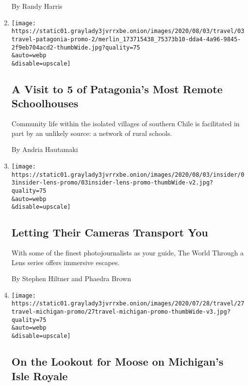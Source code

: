 \begin{enumerate}
  By Randy Harris
\item
  \href{/2020/08/03/travel/remote-schools-patagonia.html}{}

  \texttt{[image: https://static01.graylady3jvrrxbe.onion/images/2020/08/03/travel/03travel-patagonia-promo-2/merlin\_173715438\_75373b10-dda4-4a96-9845-2f9eb704acd2-thumbWide.jpg?quality=75\\\&auto=webp\\\&disable=upscale]}

  \hypertarget{a-visit-to-5-of-patagonias-most-remote-schoolhouses}{%
  \subsection{A Visit to 5 of Patagonia's Most Remote
  Schoolhouses}\label{a-visit-to-5-of-patagonias-most-remote-schoolhouses}}

  Community life within the isolated villages of southern Chile is
  facilitated in part by an unlikely source: a network of rural schools.

  By Andria Hautamaki
\item
  \href{/2020/08/03/insider/letting-their-cameras-transport-you.html}{}

  \texttt{[image: https://static01.graylady3jvrrxbe.onion/images/2020/08/03/insider/03insider-lens-promo/03insider-lens-promo-thumbWide-v2.jpg?quality=75\\\&auto=webp\\\&disable=upscale]}

  \hypertarget{letting-their-cameras-transport-you}{%
  \subsection{Letting Their Cameras Transport
  You}\label{letting-their-cameras-transport-you}}

  With some of the finest photojournalists as your guide, The World
  Through a Lens series offers immersive escapes.

  By Stephen Hiltner and Phaedra Brown
\item
  \href{/2020/07/27/travel/moose-michigan-isle-royale.html}{}

  \texttt{[image: https://static01.graylady3jvrrxbe.onion/images/2020/07/28/travel/27travel-michigan-promo/27travel-michigan-promo-thumbWide-v3.jpg?quality=75\\\&auto=webp\\\&disable=upscale]}

  \hypertarget{on-the-lookout-for-moose-on-michigans-isle-royale}{%
  \subsection{On the Lookout for Moose on Michigan's Isle
  Royale}\label{on-the-lookout-for-moose-on-michigans-isle-royale}}


\end{enumerate}
